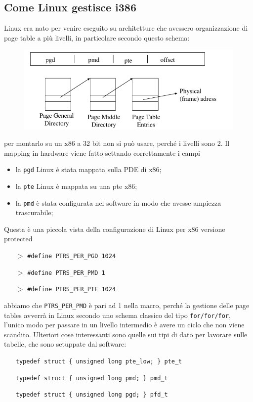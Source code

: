 \documentclass[12pt, oneside]{extbook}
\begin{document}
\subsection{Come Linux gestisce i386}
Linux era nato per venire eseguito su architetture che avessero organizzazione di page table a più livelli, in particolare secondo questo schema:
\begin{figure}[!h]
	\includegraphics[scale=0.4]{immagini/linux_i386.png}
\end{figure}
per montarlo su un x86 a 32 bit non si può usare, perché i livelli sono 2. Il mapping in hardware viene fatto settando correttamente i campi
\begin{itemize}
\item la \texttt{pgd} Linux è stata mappata sulla PDE di x86;
\item la \texttt{pte} Linux è mappata su una pte x86;
\item la \texttt{pmd} è stata configurata nel software in modo che avesse ampiezza trascurabile;
\end{itemize}
Questa è una piccola vista della configurazione di Linux per x86 versione protected
\begin{itemize}
	\item[$>$] \texttt{\#define PTRS\_PER\_PGD 1024}
	\item[$>$] \texttt{\#define PTRS\_PER\_PMD 1}
	\item[$>$] \texttt{\#define PTRS\_PER\_PTE 1024}
\end{itemize}
abbiamo che \texttt{PTRS\_PER\_PMD} è pari ad 1 nella macro, perché la gestione delle page tables avverrà in Linux secondo uno schema classico del tipo \texttt{for/for/for}, l'unico modo per passare in un livello intermedio è avere un ciclo che non viene scandito. Ulteriori cose interessanti sono quelle sui tipi di dato per lavorare sulle tabelle, che sono setuppate dal software:
\begin{itemize}
	\item[] \texttt{typedef struct \{ unsigned long pte\_low; \} pte\_t}
	\item[] \texttt{typedef struct \{ unsigned long pmd; \} pmd\_t}
	\item[] \texttt{typedef struct \{ unsigned long pgd; \} pfd\_t}
\end{itemize}
\end{document}
